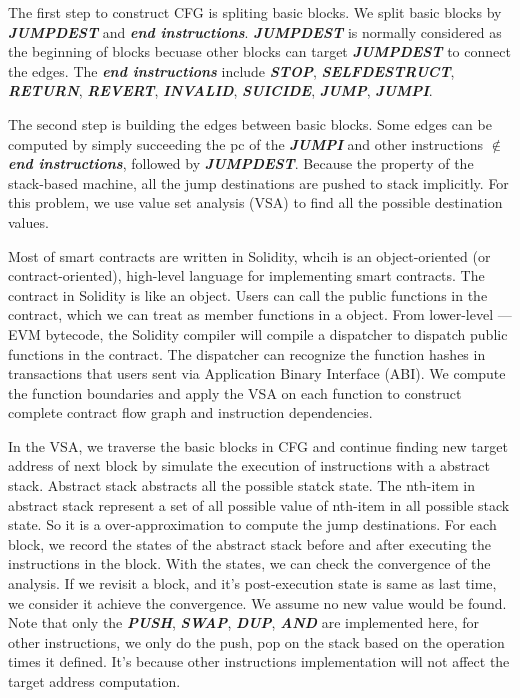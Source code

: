 \documentclass{article}
\begin{document}
The first step to construct CFG is spliting basic blocks. We split basic blocks by \textbf{\textit{JUMPDEST}} and \textbf{\textit{end instructions}}. \textbf{\textit{JUMPDEST}} is normally considered as the beginning of blocks becuase other blocks can target \textbf{\textit{JUMPDEST}} to connect the edges. The \textbf{\textit{end instructions}} include \textbf{\textit{STOP}}, \textbf{\textit{SELFDESTRUCT}}, \textbf{\textit{RETURN}}, \textbf{\textit{REVERT}}, \textbf{\textit{INVALID}}, \textbf{\textit{SUICIDE}}, \textbf{\textit{JUMP}}, \textbf{\textit{JUMPI}}.

The second step is building the edges between basic blocks. Some edges can be computed by simply succeeding the pc of the \textbf{\textit{JUMPI}} and other instructions $\notin$ \textbf{\textit{end instructions}}, followed by \textbf{\textit{JUMPDEST}}. Because the property of the stack-based machine, all the jump destinations are pushed to stack implicitly. For this problem, we use value set analysis (VSA) to find all the possible destination values.

Most of smart contracts are written in Solidity, whcih is an object-oriented (or contract-oriented), high-level language for implementing smart contracts. The contract in Solidity is like an object. Users can call the public functions in the contract, which we can treat as member functions in a object. From lower-level --- EVM bytecode, the Solidity compiler will compile a dispatcher to dispatch public functions in the contract. The dispatcher can recognize the function hashes in transactions that users sent via Application Binary Interface (ABI). We compute the function boundaries and apply the VSA on each function to construct complete contract flow graph and instruction dependencies.



In the VSA, we traverse the basic blocks in CFG and continue finding new target address of next block by simulate the execution of instructions with a abstract stack. Abstract stack abstracts all the possible statck state. The nth-item in abstract stack represent a set of all possible value of nth-item in all possible stack state. So it is a over-approximation to compute the jump destinations. For each block, we record the states of the abstract stack before and after executing the instructions in the block. With the states, we can check the convergence of the analysis. If we revisit a block, and it's post-execution state is same as last time, we consider it achieve the convergence. We assume no new value would be found. Note that only the \textbf{\textit{PUSH}}, \textbf{\textit{SWAP}}, \textbf{\textit{DUP}}, \textbf{\textit{AND}} are implemented here, for other instructions, we only do the push, pop on the stack based on the operation times it defined. It's because other instructions implementation will not affect the target address computation.
\end{document}
